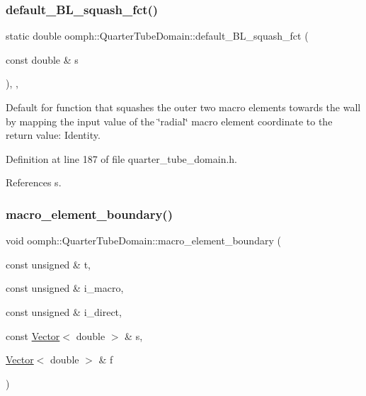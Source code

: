 \mbox{\label{classoomph_1_1QuarterTubeDomain_a3dc9c2857eb6bd7e3ee89d2a7c86bd3b}} 
\subsubsection{\texorpdfstring{default\+\_\+\+B\+L\+\_\+squash\+\_\+fct()}{default\_BL\_squash\_fct()}}
{\footnotesize\ttfamily static double oomph\+::\+Quarter\+Tube\+Domain\+::default\+\_\+\+B\+L\+\_\+squash\+\_\+fct (\begin{DoxyParamCaption}\item[{const double \&}]{s }\end{DoxyParamCaption})\hspace{0.3cm}{\ttfamily [inline]}, {\ttfamily [static]}, {\ttfamily [private]}}



Default for function that squashes the outer two macro elements towards the wall by mapping the input value of the \char`\"{}radial\char`\"{} macro element coordinate to the return value\+: Identity. 



Definition at line 187 of file quarter\+\_\+tube\+\_\+domain.\+h.



References s.

\mbox{\label{classoomph_1_1QuarterTubeDomain_afacee4fe8a6fbc33618643398f5b8ab1}} 
\subsubsection{\texorpdfstring{macro\+\_\+element\+\_\+boundary()}{macro\_element\_boundary()}}
{\footnotesize\ttfamily void oomph\+::\+Quarter\+Tube\+Domain\+::macro\+\_\+element\+\_\+boundary (\begin{DoxyParamCaption}\item[{const unsigned \&}]{t,  }\item[{const unsigned \&}]{i\+\_\+macro,  }\item[{const unsigned \&}]{i\+\_\+direct,  }\item[{const \hyperlink{classoomph_1_1Vector}{Vector}$<$ double $>$ \&}]{s,  }\item[{\hyperlink{classoomph_1_1Vector}{Vector}$<$ double $>$ \&}]{f }\end{DoxyParamCaption})\hspace{0.3cm}{\ttfamily [virtual]}}



